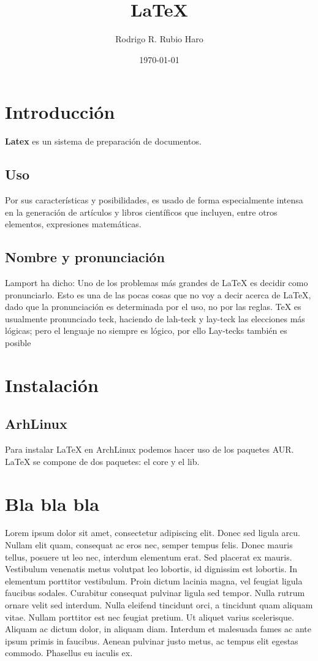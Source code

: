 \documentclass[a4paper]{article}
\title{LaTeX}
\author{Rodrigo R. Rubio Haro}
\date{\today}
\begin{document}
\thispagestyle{empty}



\maketitle
\tableofcontents 
\newpage


    \section{Introducción}
    \noindent
    \doublespacing
    
    \textbf{Latex}  es un \color{red} sistema \color{black} de preparación de documentos.
    
    \subsection{Uso}
    Por sus características y posibilidades, es usado de forma especialmente intensa en la generación de artículos y libros científicos que incluyen, entre otros elementos, expresiones matemáticas.
    \subsection{Nombre y pronunciación}
    Lamport ha dicho: Uno de los problemas más grandes de LaTeX es decidir como pronunciarlo. Esto es una de las pocas cosas que no voy a decir acerca de LaTeX, dado que la pronunciación es determinada por el uso, no por las reglas. TeX es usualmente pronunciado teck, haciendo de lah-teck y lay-teck las elecciones más lógicas; pero el lenguaje no siempre es lógico, por ello Lay-tecks también es posible
    \section{Instalación}
    \singlespacing
    \subsection{ArhLinux}
    Para instalar LaTeX en ArchLinux podemos hacer uso de los paquetes AUR.
    LaTeX se compone de dos paquetes:\hspace{.5cm} el core y el lib.
    \newpage
    \section{Bla bla bla}
    Lorem ipsum dolor sit amet, consectetur adipiscing elit. Donec sed ligula arcu. Nullam elit quam, consequat ac eros nec, semper tempus felis. Donec mauris tellus, posuere ut leo nec, interdum elementum erat. Sed placerat ex mauris. Vestibulum venenatis metus volutpat leo lobortis, id dignissim est lobortis. In elementum porttitor vestibulum. Proin dictum lacinia magna, vel feugiat ligula faucibus sodales. Curabitur consequat pulvinar ligula sed tempor. Nulla rutrum ornare velit sed interdum. Nulla eleifend tincidunt orci, a tincidunt quam aliquam vitae. Nullam porttitor est nec feugiat pretium. Ut aliquet varius scelerisque. Aliquam ac dictum dolor, in aliquam diam. Interdum et malesuada fames ac ante ipsum primis in faucibus. Aenean pulvinar justo metus, ac tempus elit egestas commodo. Phasellus eu iaculis ex.
\end{document}
